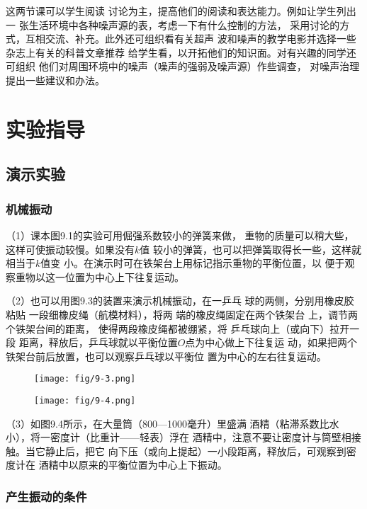这两节课可以学生阅读
讨论为主，提高他们的阅读和表达能力。例如让学生列出一
张生活环境中各种噪声源的表，考虑一下有什么控制的方法，
采用讨论的方式，互相交流、补充。此外还可组织看有关超声
波和噪声的教学电影并选择一些杂志上有关的科普文章推荐
给学生看，以开拓他们的知识面。对有兴趣的同学还可组织
他们对周围环境中的噪声（噪声的强弱及噪声源）作些调查，
对噪声治理提出一些建议和办法。

\section{实验指导}
\subsection{演示实验}
\subsubsection{机械振动}
（1）课本图9.1的实验可用倔强系数较小的弹簧来做，
重物的质量可以稍大些，这样可使振动较慢。如果没有$k$值
较小的弹簧，也可以把弹簧取得长一些，这样就相当于$k$值变
小。在演示时可在铁架台上用标记指示重物的平衡位置，以
便于观察重物以这一位置为中心上下往复运动。

（2）也可以用图9.3的装置来演示机械振动，在一乒乓
球的两侧，分别用橡皮胶粘贴
一段细橡皮绳（航模材料），将两
端的橡皮绳固定在两个铁架台
上，调节两个铁架台间的距离，
使得两段橡皮绳都被绷紧，将
乒乓球向上（或向下）拉开一段
距离，释放后，乒乓球就以平衡位置$O$点为中心做上下往复运
动，如果把两个铁架台前后放置，也可以观察乒乓球以平衡位
置为中心的左右往复运动。
\begin{figure}[htp]\centering
    \begin{minipage}[t]{0.48\textwidth}
    \centering
\texttt{[image: fig/9-3.png]}
    \caption{}
    \end{minipage}
    \begin{minipage}[t]{0.48\textwidth}
    \centering
\texttt{[image: fig/9-4.png]}
    \caption{}
    \end{minipage}
    \end{figure}

    （3）如图9.4所示，在大量筒（800—1000毫升）里盛满
酒精（粘滞系数比水小），将一密度计（比重计——轻表）浮在
酒精中，注意不要让密度计与筒壁相接触。当它静止后，把它
向下压（或向上提起）一小段距离，释放后，可观察到密度计在
酒精中以原来的平衡位置为中心上下振动。

\subsubsection{产生振动的条件}

